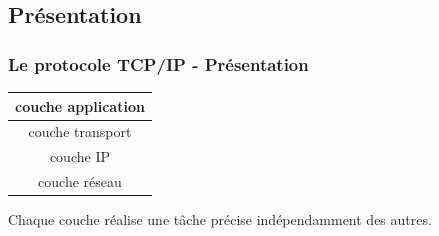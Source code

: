 \documentclass[svgnames,11pt]{beamer}
\begin{document}
\subsection{Présentation}
\begin{frame}
    \frametitle{Le protocole TCP/IP - Présentation}

    \begin{center}
        \begin{tabular}{|c|}
            \hline
            couche application\\
            \hline
            couche transport\\
            \hline
            couche IP\\
            \hline
            couche réseau\\
            \hline
        \end{tabular}
    \end{center}

    \begin{aretenir}[]
    Chaque couche réalise une tâche précise indépendamment des autres.
    \end{aretenir}
\end{frame}
\end{document}
